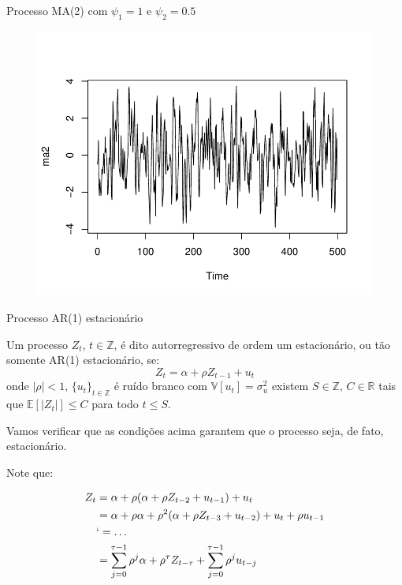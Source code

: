 \documentclass[11pt]{beamer}
\newenvironment{wideitemize}{\itemize\addtolength{\itemsep}{10pt}}{\enditemize}
\begin{document}
\begin{frame}{Processo MA(2) com $\psi_1=1$ e $\psi_2 = 0.5$}
		\begin{figure}
		\includegraphics[scale=0.8]{graficos/ma2.pdf}
	\end{figure}
\end{frame}
\begin{frame}{Processo  AR(1) estacionário}
	\begin{wideitemize}
		\item Um processo $Z_t$, $t \in \mathbb{Z}$, é dito autorregressivo de ordem um estacionário, ou tão somente AR(1) estacionário, se:
		\begin{equation*}
			Z_t = \alpha + \rho Z_{t-1} + u_t
		\end{equation*} 
		onde $|\rho| < 1$, $\{u_t\}_{t \in \mathbb{Z}}$ é ruído branco com $\mathbb{V}[u_t] = \sigma^2_u$ existem $S \in \mathbb{Z}$, $C \in \mathbb{R}$  tais que $\mathbb{E}[|Z_t|] \leq C$ para todo $t \leq S$.
		
		\item Vamos verificar que as condições acima garantem que o processo seja, de fato, estacionário.
		\item Note que:
		
		\begin{equation*}
			\begin{aligned}			
				Z_t &=  \alpha + \rho(\alpha + \rho Z_{t-2} + u_{t-1}) + u_{t}  \\
				    &= \alpha + \rho \alpha  + \rho^2(\alpha + \rho Z_{t-3} + u_{t-2}) + u_{t} + \rho u_{t-1} \\
				     &`= \ldots \\
				     & = \sum_{j=0}^{\tau - 1} \rho^{j} \alpha +  \rho^{\tau} Z_{t-\tau} +  \sum_{j=0}^{\tau - 1} \rho^{j} u_{t-j}\\
			\end{aligned}
		\end{equation*}
		
		

	\end{wideitemize}
\end{frame}
\end{document}
